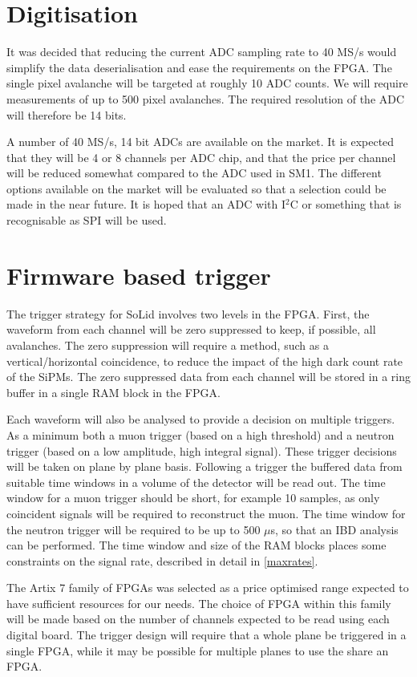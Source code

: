 \documentclass[a4paper]{article}
\begin{document}
\section{Digitisation}

It was decided that reducing the current ADC sampling rate to 40 MS/s would simplify the data deserialisation and ease the requirements on the FPGA.
The single pixel avalanche will be targeted at roughly 10 ADC counts.
We will require measurements of up to 500 pixel avalanches.
The required resolution of the ADC will therefore be 14 bits.

A number of 40 MS/s, 14 bit ADCs are available on the market.
It is expected that they will be 4 or 8 channels per ADC chip, and that the price per channel will be reduced somewhat compared to the ADC used in SM1.
The different options available on the market will be evaluated so that a selection could be made in the near future.
It is hoped that an ADC with I$^2$C or something that is recognisable as SPI will be used.

\section{Firmware based trigger}

The trigger strategy for SoLid involves two levels in the FPGA.
First, the waveform from each channel will be zero suppressed to keep, if possible, all avalanches.
The zero suppression will require a method, such as a vertical/horizontal coincidence, to reduce the impact of the high dark count rate of the SiPMs.
The zero suppressed data from each channel will be stored in a ring buffer in a single RAM block in the FPGA.

Each waveform will also be analysed to provide a decision on multiple triggers.
As a minimum both a muon trigger (based on a high threshold) and a neutron trigger (based on a low amplitude, high integral signal).
These trigger decisions will be taken on plane by plane basis.
Following a trigger the buffered data from suitable time windows in a volume of the detector will be read out.
The time window for a muon trigger should be short, for example 10 samples, as only coincident signals will be required to reconstruct the muon.
The time window for the neutron trigger will be required to be up to 500 $\mu$s, so that an IBD analysis can be performed.
The time window and size of the RAM blocks places some constraints on the signal rate, described in detail in \cref{maxrates}.

The Artix 7 family of FPGAs was selected as a price optimised range expected to have sufficient resources for our needs.
The choice of FPGA within this family will be made based on the number of channels expected to be read using each digital board.
The trigger design will require that a whole plane be triggered in a single FPGA, while it may be possible for multiple planes to use the share an FPGA.
\end{document}
